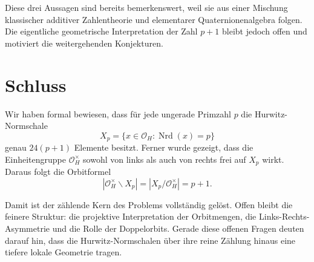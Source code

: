 \documentclass[12pt,a4paper]{article}
\theoremstyle{plain}
\theoremstyle{definition}
\theoremstyle{remark}
\newcommand{\OH}{\mathcal O_H}
\newcommand{\nrd}{\operatorname{Nrd}}
\begin{document}
	Diese drei Aussagen sind bereits bemerkenswert, weil sie aus einer Mischung klassischer additiver Zahlentheorie und elementarer Quaternionenalgebra folgen. Die eigentliche geometrische Interpretation der Zahl \(p+1\) bleibt jedoch offen und motiviert die weitergehenden Konjekturen.
	
	\section{Schluss}
	
	Wir haben formal bewiesen, dass für jede ungerade Primzahl \(p\) die Hurwitz-Normschale
	\[
	X_p=\{x\in\OH:\nrd(x)=p\}
	\]
	genau \(24(p+1)\) Elemente besitzt. Ferner wurde gezeigt, dass die Einheitengruppe \(\OH^\times\) sowohl von links als auch von rechts frei auf \(X_p\) wirkt. Daraus folgt die Orbitformel
	\[
	|\OH^\times\backslash X_p|
	=
	|X_p/\OH^\times|
	=
	p+1.
	\]
	
	Damit ist der zählende Kern des Problems vollständig gelöst. Offen bleibt die feinere Struktur: die projektive Interpretation der Orbitmengen, die Links-Rechts-Asymmetrie und die Rolle der Doppelorbits. Gerade diese offenen Fragen deuten darauf hin, dass die Hurwitz-Normschalen über ihre reine Zählung hinaus eine tiefere lokale Geometrie tragen.
	
\end{document}
